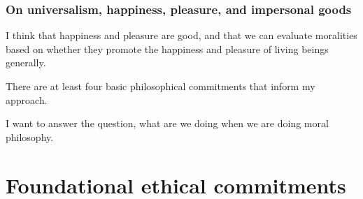 \subsection{On universalism, happiness, pleasure, and impersonal goods}
\label{sec:org8fff072}
I think that happiness and pleasure are good, and that we can evaluate
moralities based on whether they promote the happiness and pleasure of living
beings generally.



There are at least four basic philosophical commitments that inform my approach.

I want to answer the question, what are we doing when we are doing moral
philosophy.
\chapter{Foundational ethical commitments}
\label{ch:eth_com}

